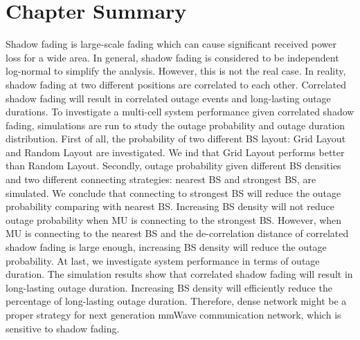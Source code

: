  \section{Chapter Summary}
 \label{ch4:Conclusion}
 Shadow fading is large-scale fading which can cause significant received power loss for a wide area. In general, shadow fading is considered to be independent log-normal to simplify the analysis. However, this is not the real case. In reality, shadow fading at two different positions are correlated to each other. Correlated shadow fading will result in correlated outage events and long-lasting outage durations. To investigate a multi-cell system performance given correlated shadow fading, simulations are run to study the outage probability and outage duration distribution. First of all, the probability of two different BS layout: Grid Layout and Random Layout are investigated. We ind that Grid Layout performs better than Random Layout. Secondly, outage probability given different BS densities and two different connecting strategies: nearest BS and strongest BS, are simulated. We conclude that connecting to strongest BS will reduce the outage probability comparing with nearest BS. Increasing BS density will not reduce outage probability when MU is connecting to the strongest BS. However, when MU is connecting to the nearest BS and the de-correlation distance of correlated shadow fading is large enough, increasing BS density will reduce the outage probability.  At last, we investigate system performance in terms of outage duration. The simulation results show that correlated shadow fading will result in long-lasting outage duration. Increasing BS density will efficiently reduce the percentage of long-lasting outage duration. Therefore, dense network might be a proper strategy for next generation mmWave communication network, which is sensitive to shadow fading.
 

